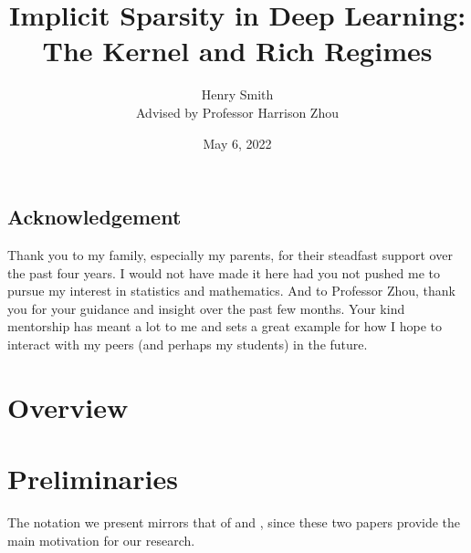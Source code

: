 \documentclass{article}
\title{\textbf{Implicit Sparsity in Deep Learning:\\The Kernel and Rich Regimes}}
\author[]{Henry Smith\\
Advised by Professor Harrison Zhou}
\affil[]{\normalsize Yale University}
\date{May 6, 2022}
\begin{document}
\maketitle

\begin{abstract}

\end{abstract}

\pagebreak

\vspace*{\fill}

\begin{centering}
\section*{Acknowledgement}
Thank you to my family, especially my parents, for their steadfast support over the past four years. I would not have made it here had you not pushed me to pursue my interest in statistics and mathematics. And to Professor Zhou, thank you for your guidance and insight over the past few months. Your kind mentorship has meant a lot to me and sets a great example for how I hope to interact with my peers (and perhaps my students) in the future. 
\end{centering}

\vspace*{\fill}

\pagebreak

\vspace*{\fill}

\begin{centering}
\tableofcontents
\end{centering}

\vspace*{\fill}

\pagebreak

\section{Overview}

\section{Preliminaries}\label{preliminaries}

The notation we present mirrors that of \cite{chizat2018lazy} and \cite{woodworth2020kernel}, since these two papers provide the main motivation for our research.
\end{document}
